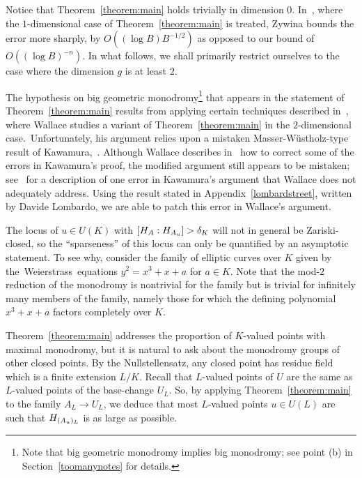 \begin{remark}\label{remkydoo}
	Notice that Theorem~\ref{theorem:main} holds trivially in dimension $0$. In~\cite[Theorem 1.15]{zywina2010hilbert}, where the $1$-dimensional case of Theorem~\ref{theorem:main} is treated, Zywina bounds the error more sharply, by
$O( (\log B)B^{-1/2} )$ as opposed to our bound of
$O( (\log B)^{-n} )$.
In what follows, we shall primarily restrict ourselves to the case where the dimension $g$ is at least $2$.
\end{remark}

\begin{remark}
	The hypothesis on big geometric monodromy\footnote{Note that big geometric monodromy implies big monodromy; see point (b) in Section~\ref{toomanynotes} for details.} that appears in the statement of Theorem~\ref{theorem:main} results from applying certain techniques described in~\cite{scoopdedoo}, where Wallace studies a variant of Theorem~\ref{theorem:main} in the $2$-dimensional case.~Unfortunately, his argument relies upon a mistaken Masser-W\"{u}stholz-type result of Kawamura,~\cite[Main Theorem 2]{ifyouseekamy}. Although Wallace describes in~\cite[p.~468]{scoopdedoo} how to correct some of the errors in Kawamura's proof, the modified argument still appears to be mistaken; see~\cite[p.~27]{lombardoGL2type} for a description of one error in Kawamura's argument that Wallace does not adequately address.
Using the result stated in Appendix~\ref{lombardstreet}, written by Davide Lombardo, we are able to patch this error in Wallace's argument.
\end{remark}

\begin{remark}
	\label{remark:}
    The locus of $u \in U(K)$ with $[H_A : H_{A_u}] > \delta_K$ will not in general be Zariski-closed, so the ``sparseness'' of this locus can only be quantified by an asymptotic statement. To see why, consider the family of
	elliptic curves over $K$
	given by \mbox{the Weierstrass equations} $y^2 = x^3 + x + a$ for $a \in K$. Note that the mod-$2$ reduction of the monodromy is nontrivial for the family but is trivial for infinitely many members of the family, namely those for which the defining polynomial $x^3 + x + a$ factors completely over $K$.
\end{remark}

\begin{remark}
	\label{remark:}
	Theorem~\ref{theorem:main} addresses the proportion of $K$-valued points with maximal monodromy, but it is natural to ask about the monodromy groups of other closed points. By the Nullstellensatz, any closed point has residue field which is a finite extension $L/K$. Recall that $L$-valued points of $U$ are the same as $L$-valued points of the base-change $U_L$. So, by applying Theorem~\ref{theorem:main} to the family $A_L \to U_L$, we deduce that most $L$-valued points $u \in U(L)$ are such that $H_{(A_u)_L}$ is as large as possible.
\end{remark}

